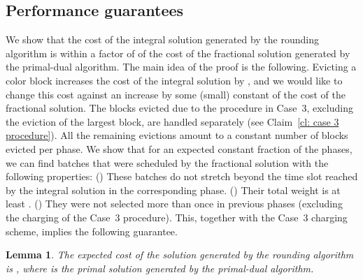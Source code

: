 \documentclass[12pt]{article}
\newtheorem{lemma}[theorem]{Lemma}
\begin{document}
\subsection{Performance guarantees}

We show that the cost of the integral solution generated
by the rounding algorithm is within a factor of  of
the cost of the fractional solution generated by the
primal-dual algorithm. The main idea of the proof is the
following. Evicting a color block increases the cost of the
integral solution by , and we would like to change this
cost against an increase by some (small) constant of the
cost of the fractional solution. The blocks evicted due to 
the procedure in Case~3, excluding the eviction of the largest 
block, are handled separately (see Claim~\ref{cl: case 3 procedure}).
All the remaining evictions amount to a constant number of
blocks evicted per phase. We show that for an expected
constant fraction of the phases, we can find batches that
were scheduled by the fractional solution with the following
properties: () These batches do not stretch beyond the time
slot reached by the integral solution in the corresponding phase.
() Their total weight is at least . () They were
not selected more than once in previous phases (excluding the 
charging of the Case~3 procedure). This, together with the
Case~3 charging scheme, implies the following guarantee.
\begin{lemma}\label{lm: rounding main}
The expected cost of the solution generated by the
rounding algorithm is ,
where  is the primal solution generated by the
primal-dual algorithm.
\end{lemma}
\end{document}
